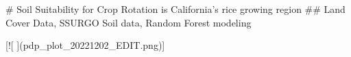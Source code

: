 # Soil Suitability for Crop Rotation is California's rice growing region  
## Land Cover Data, SSURGO Soil data, Random Forest modeling  



[![ ](pdp_plot_20221202_EDIT.png)]
